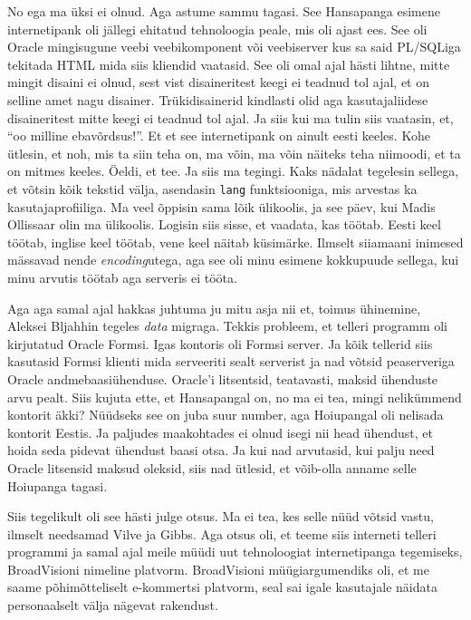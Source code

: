 No ega ma üksi ei olnud. Aga astume sammu tagasi. See Hansapanga esimene internetipank oli jällegi ehitatud tehnoloogia peale, mis oli ajast ees. See oli Oracle mingisugune veebi veebikomponent või veebiserver kus sa said PL/SQLiga tekitada HTML mida siis kliendid vaatasid. See oli omal ajal hästi lihtne, mitte mingit disaini ei olnud, sest vist disaineritest keegi ei teadnud tol ajal, et on selline amet nagu disainer. Trükidisainerid kindlasti olid aga kasutajaliidese disaineritest mitte keegi ei teadnud tol ajal. Ja siis kui ma tulin siis vaatasin, et, \enquote{oo milline ebavõrdsus!}. Et et see internetipank on ainult eesti keeles. Kohe ütlesin, et noh, mis ta siin teha on, ma võin, ma võin näiteks teha niimoodi, et ta on mitmes keeles. Öeldi, et tee. Ja siis ma tegingi. Kaks nädalat tegelesin sellega, et võtsin kõik tekstid välja, asendasin \verb|lang| funktsiooniga, mis arvestas ka kasutajaprofiiliga. Ma veel õppisin sama lõik ülikoolis, ja see päev, kui Madis Ollissaar olin ma ülikoolis. Logisin siis sisse, et vaadata, kas töötab. Eesti keel töötab, inglise keel töötab, vene keel näitab küsimärke. Ilmselt siiamaani inimesed mässavad nende \emph{encoding}utega, aga see oli minu esimene kokkupuude sellega, kui minu arvutis töötab aga serveris ei tööta.

Aga aga samal ajal hakkas juhtuma ju mitu asja nii et, toimus ühinemine, Aleksei Bljahhin tegeles \emph{data} migraga. Tekkis probleem, et telleri programm oli kirjutatud Oracle Formsi. Igas kontoris oli Formsi server. Ja kõik tellerid siis kasutasid Formsi klienti mida serveeriti sealt serverist ja nad võtsid peaserveriga Oracle andmebaasiühenduse. Oracle'i litsentsid, teatavasti, maksid ühenduste arvu pealt. Siis kujuta ette, et Hansapangal on, no ma ei tea, mingi nelikümmend kontorit äkki? Nüüdseks see on juba suur number, aga Hoiupangal oli nelisada kontorit Eestis. Ja paljudes maakohtades ei olnud isegi nii head ühendust, et hoida seda pidevat ühendust baasi otsa. Ja kui nad arvutasid, kui palju need Oracle litsensid maksud oleksid, siis nad ütlesid, et võib-olla anname selle Hoiupanga tagasi. 

Siis tegelikult oli see hästi julge otsus. Ma ei tea, kes selle nüüd võtsid vastu, ilmselt needsamad Vilve ja Gibbs. Aga otsus oli, et teeme siis interneti telleri programmi ja samal ajal meile müüdi uut tehnoloogiat internetipanga tegemiseks, BroadVisioni nimeline platvorm. BroadVisioni müügiargumendiks oli, et me saame põhimõtteliselt e-kommertsi platvorm,  seal sai igale kasutajale näidata personaalselt välja nägevat rakendust.


